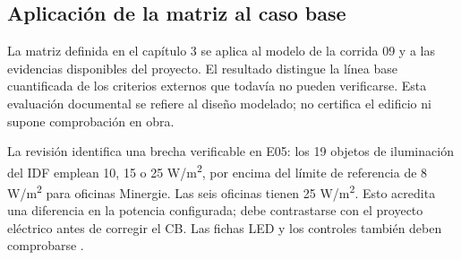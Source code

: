 \subsection{Aplicación de la matriz al caso base}
\label{sec:matriz-caso-base}
La matriz definida en el capítulo 3 se aplica al modelo de la corrida 09 y a las evidencias disponibles del proyecto. El resultado distingue la línea base cuantificada de los criterios externos que todavía no pueden verificarse. Esta evaluación documental se refiere al diseño modelado; no certifica el edificio ni supone comprobación en obra.

La revisión identifica una brecha verificable en E05: los 19 objetos de iluminación del IDF emplean 10, 15 o 25 W/m\textsuperscript{2}, por encima del límite de referencia de 8 W/m\textsuperscript{2} para oficinas Minergie. Las seis oficinas tienen 25 W/m\textsuperscript{2}. Esto acredita una diferencia en la potencia configurada; debe contrastarse con el proyecto eléctrico antes de corregir el CB. Las fichas LED y los controles también deben comprobarse \parencite{minergieLatamReglamento2025}.

